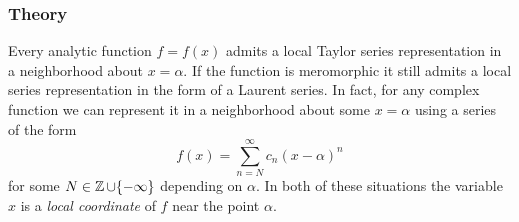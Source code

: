 \subsubsection*{Theory}

Every analytic function $f = f(x)$ admits a local Taylor series
representation in a neighborhood about $x = \alpha$. If the function is
meromorphic it still admits a local series representation in the form of
a Laurent series. In fact, for any complex function we can represent it
in a neighborhood about some $x = \alpha$ using a series of the form
\[
    f(x) = \sum_{n=N}^\infty c_n (x-\alpha)^n
\]
for some $N \in \operatorname{\mathbb{Z}} \cup \{-\infty\}$ depending on $\alpha$. In both of
these situations the variable $x$ is a {\it local coordinate} of $f$
near the point $\alpha$.

